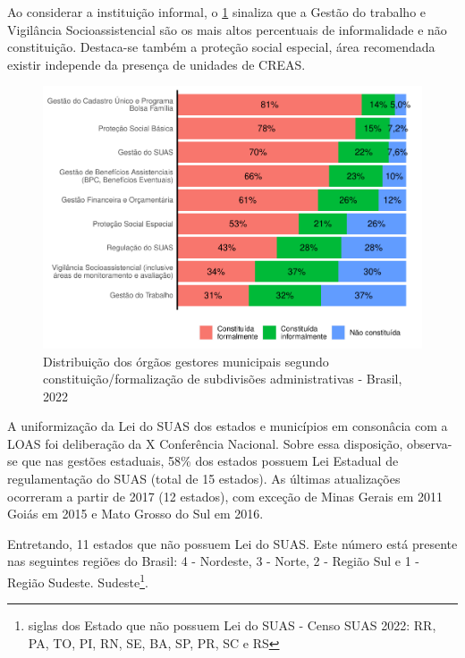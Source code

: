 \documentclass[
  brazilian]{report}
\begin{document}
Ao considerar a instituição informal, o
\cref{fig:municipais-constituicao-subdivisoes} sinaliza que a Gestão do
trabalho e Vigilância Socioassistencial são os mais altos percentuais de
informalidade e não constituição. Destaca-se também a proteção social
especial, área recomendada existir independe da presença de unidades de
CREAS.

\begin{figure}
\includegraphics{Censo-SUAS-2022_files/figure-latex/municipais-constituicao-subdivisoes-1} \caption[Distribuição dos órgãos gestores municipais segundo constituição/formalização de subdivisões administrativas - Brasil, 2022]{Distribuição dos órgãos gestores municipais segundo constituição/formalização de subdivisões administrativas - Brasil, 2022}\label{fig:municipais-constituicao-subdivisoes}
\end{figure}

A uniformização da Lei do SUAS dos estados e municípios em consonâcia
com a LOAS foi deliberação da X Conferência Nacional. Sobre essa
disposição, observa-se que nas gestões estaduais, 58\% dos estados
possuem Lei Estadual de regulamentação do SUAS (total de 15 estados). As
últimas atualizações ocorreram a partir de 2017 (12 estados), com
exceção de Minas Gerais em 2011 Goiás em 2015 e Mato Grosso do Sul em
2016.

Entretando, 11 estados que não possuem Lei do SUAS. Este número está
presente nas seguintes regiões do Brasil: 4 - Nordeste, 3 - Norte, 2 -
Região Sul e 1 - Região Sudeste.
Sudeste\footnote{siglas dos Estado que não possuem Lei do SUAS - Censo SUAS 2022: RR, PA, TO, PI, RN, SE, BA, SP, PR, SC e RS}.
\end{document}

